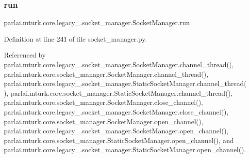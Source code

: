 \mbox{\label{classparlai_1_1mturk_1_1core_1_1legacy__2018_1_1socket__manager_1_1SocketManager_aafe5700dd3b0305ed953a08679b9ba80}} 
\subsubsection{\texorpdfstring{run}{run}}
{\footnotesize\ttfamily parlai.\+mturk.\+core.\+legacy\+\_.\+socket\+\_\+manager.\+Socket\+Manager.\+run}



Definition at line 241 of file socket\+\_\+manager.\+py.



Referenced by parlai.\+mturk.\+core.\+legacy\+\_.\+socket\+\_\+manager.\+Socket\+Manager.\+channel\+\_\+thread(), parlai.\+mturk.\+core.\+socket\+\_\+manager.\+Socket\+Manager.\+channel\+\_\+thread(), parlai.\+mturk.\+core.\+legacy\+\_.\+socket\+\_\+manager.\+Static\+Socket\+Manager.\+channel\+\_\+thread(), parlai.\+mturk.\+core.\+socket\+\_\+manager.\+Static\+Socket\+Manager.\+channel\+\_\+thread(), parlai.\+mturk.\+core.\+socket\+\_\+manager.\+Socket\+Manager.\+close\+\_\+channel(), parlai.\+mturk.\+core.\+legacy\+\_.\+socket\+\_\+manager.\+Socket\+Manager.\+close\+\_\+channel(), parlai.\+mturk.\+core.\+socket\+\_\+manager.\+Socket\+Manager.\+open\+\_\+channel(), parlai.\+mturk.\+core.\+legacy\+\_.\+socket\+\_\+manager.\+Socket\+Manager.\+open\+\_\+channel(), parlai.\+mturk.\+core.\+socket\+\_\+manager.\+Static\+Socket\+Manager.\+open\+\_\+channel(), and parlai.\+mturk.\+core.\+legacy\+\_.\+socket\+\_\+manager.\+Static\+Socket\+Manager.\+open\+\_\+channel().

\mbox{\label{classparlai_1_1mturk_1_1core_1_1legacy__2018_1_1socket__manager_1_1SocketManager_a9b2eed50e092797ab535a44b047519c4}} 
